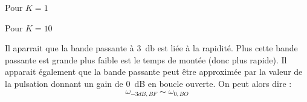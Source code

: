 Pour $K=1$
\begin{center}
    
\end{center}
Pour $K=10$
\begin{center}
    
\end{center}
\clearpage
Il aparrait que la bande passante à \SI{3}{\decibel} est liée à la rapidité. 
Plus cette bande passante est grande plus faible est le temps de montée (donc plus rapide).
Il apparait également que la bande passante peut être approximée par la valeur de la pulsation
donnant un gain de \SI{0}{\dB} en boucle ouverte. On peut alors dire :
\[
\omega_{-3dB,BF}\sim\omega_{0,BO}
\]


